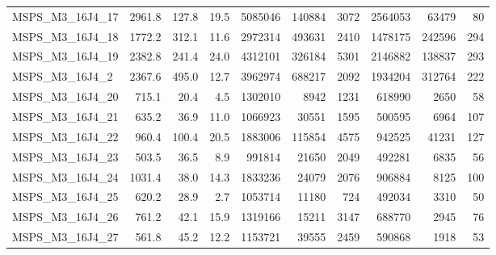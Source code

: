 \documentclass[a4paper,10pt]{article}
\theoremstyle{definition}
\begin{document}
\begin{table}[t]
\begin{scriptsize}
\begin{tabular*}{\textwidth}{@{}l@{\;\;\extracolsep{\fill}}rrrrrrrrr@{}}
MSPS\_M3\_16J4\_17 & \num{2961.8} & \num{ 127.8} & \num{  19.5} & \num{   5085046} & \num{    140884} & \num{      3072} & \num{   2564053} & \num{     63479} & \num{        80}\\
MSPS\_M3\_16J4\_18 & \num{1772.2} & \num{ 312.1} & \num{  11.6} & \num{   2972314} & \num{    493631} & \num{      2410} & \num{   1478175} & \num{    242596} & \num{       294}\\
MSPS\_M3\_16J4\_19 & \num{2382.8} & \num{ 241.4} & \num{  24.0} & \num{   4312101} & \num{    326184} & \num{      5301} & \num{   2146882} & \num{    138837} & \num{       293}\\
 MSPS\_M3\_16J4\_2 & \num{2367.6} & \num{ 495.0} & \num{  12.7} & \num{   3962974} & \num{    688217} & \num{      2092} & \num{   1934204} & \num{    312764} & \num{       222}\\
MSPS\_M3\_16J4\_20 & \num{ 715.1} & \num{  20.4} & \num{   4.5} & \num{   1302010} & \num{      8942} & \num{      1231} & \num{    618990} & \num{      2650} & \num{        58}\\
MSPS\_M3\_16J4\_21 & \num{ 635.2} & \num{  36.9} & \num{  11.0} & \num{   1066923} & \num{     30551} & \num{      1595} & \num{    500595} & \num{      6964} & \num{       107}\\
MSPS\_M3\_16J4\_22 & \num{ 960.4} & \num{ 100.4} & \num{  20.5} & \num{   1883006} & \num{    115854} & \num{      4575} & \num{    942525} & \num{     41231} & \num{       127}\\
MSPS\_M3\_16J4\_23 & \num{ 503.5} & \num{  36.5} & \num{   8.9} & \num{    991814} & \num{     21650} & \num{      2049} & \num{    492281} & \num{      6835} & \num{        56}\\
MSPS\_M3\_16J4\_24 & \num{1031.4} & \num{  38.0} & \num{  14.3} & \num{   1833236} & \num{     24079} & \num{      2076} & \num{    906884} & \num{      8125} & \num{       100}\\
MSPS\_M3\_16J4\_25 & \num{ 620.2} & \num{  28.9} & \num{   2.7} & \num{   1053714} & \num{     11180} & \num{       724} & \num{    492034} & \num{      3310} & \num{        50}\\
MSPS\_M3\_16J4\_26 & \num{ 761.2} & \num{  42.1} & \num{  15.9} & \num{   1319166} & \num{     15211} & \num{      3147} & \num{    688770} & \num{      2945} & \num{        76}\\
MSPS\_M3\_16J4\_27 & \num{ 561.8} & \num{  45.2} & \num{  12.2} & \num{   1153721} & \num{     39555} & \num{      2459} & \num{    590868} & \num{      1918} & \num{        53}\\

\end{tabular*}
\end{scriptsize}
\end{table}
\end{document}
